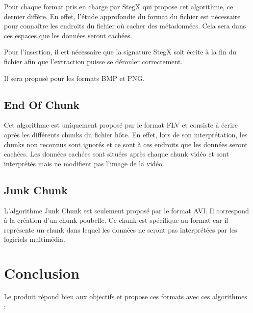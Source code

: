 \documentclass[11pt]{article}
\begin{document}
Pour chaque format pris en charge par StegX qui propose cet algorithme, 
ce dernier diffère. En effet, l'étude approfondie du format du fichier est 
nécessaire pour connaître les endroits du fichier où cacher des métadonnées. 
Cela sera dans ces espaces que les données seront cachées. 

Pour l'insertion, il est nécessaire que la signature StegX soit écrite à 
la fin du fichier afin que l'extraction puisse se dérouler correctement. 

Il sera proposé pour les formats BMP et PNG. 

\subsection{End Of Chunk}

Cet algorithme est uniquement proposé par le format FLV et consiste à 
écrire après les différents chunks du fichier hôte. En effet, lors de 
son interprétation, les chunks non reconnus sont ignorés et ce sont à ces 
endroits que les données seront cachées. 
Les données cachées sont situées après chaque chunk vidéo et sont interprétés 
mais ne modifient pas l'image de la vidéo. 

\subsection{Junk Chunk}

L'algorithme Junk Chunk est seulement proposé par le format AVI. Il correspond 
à la création d'un chunk poubelle. Ce chunk est spécifique au format car il
représente un chunk dans lequel les données ne seront pas interprétées par 
les logiciels multimédia. 

\section{Conclusion}

Le produit répond bien aux objectifs et propose ces formats avec ces 
algorithmes : 
\newline
\end{document}

